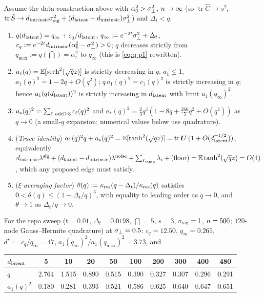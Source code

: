 \begin{lemma}\label{lem:coeffs-buf}
Assume the data construction above with $\alpha_0^2>\sigma_{\perp}^2$, $n\to\infty$ (so $\operatorname{tr}\hat C\to s^2$, $\operatorname{tr}\hat S\to d_{\mathrm{intrinsic}}\sigma_{\mathrm{sig}}^2+(d_{\mathrm{latent}}-d_{\mathrm{intrinsic}})\sigma_{\perp}^2$) and $\Delta_t<q$.
\begin{enumerate}
\item[(i)] $q(d_{\mathrm{latent}})=q_\infty+c_q/d_{\mathrm{latent}}$, $q_\infty:=e^{-2t}\sigma_{\perp}^2+\Delta_t$, $c_q:=e^{-2t}d_{\mathrm{intrinsic}}(\alpha_0^2-\sigma_{\perp}^2)>0$; $q$ decreases strictly from $q_{\max}:=q(\dint)=\alpha_t^2$ to $q_\infty$ (this is \eqref{eq:q-p1} rewritten).
\item[(ii)] $a_1(q)=\mathbb{E}[\operatorname{sech}^2(\sqrt qz)]$ is strictly decreasing in $q$, $a_1\le1$, $a_1(q)^2=1-2q+O(q^2)$; $q\,a_1(q)^2=c_1(q)^2$ is strictly increasing in $q$; hence $a_1(q(d_{\mathrm{latent}}))^2$ is strictly increasing in $d_{\mathrm{latent}}$ with limit $a_1(q_\infty)^2$.
\item[(iii)] $a_*(q)^2=\sum_{\ell\ {\rm odd}\ge3}c_\ell(q)^2$ and $a_*(q)^2=\tfrac23q^3(1-8q+\tfrac{266}{5}q^2+O(q^3))$ as $q\to0$ (a small-$q$ expansion; numerical values below use quadrature).
\item[(iv)] (\emph{Trace identity}) $a_1(q)^2q+a_*(q)^2=\mathbb{E}[\tanh^2(\sqrt qz)]=\operatorname{tr}\bm{U}\,(1+O(d_{\mathrm{latent}}^{-1/2}))$; equivalently $d_{\mathrm{intrinsic}}\lambda^{\rm sig}+(d_{\mathrm{latent}}-d_{\mathrm{intrinsic}})\lambda^{\rm noise}+\sum_{I_{\rm samp}}\lambda_i+(\text{floor})=\mathbb{E}\tanh^2(\sqrt qz)=O(1)$, which any proposed edge must satisfy.
\item[(v)] (\emph{$\xi$-averaging factor}) $\theta(q):=\kappa_{\rm res}(q-\Delta_t)/\kappa_{\rm res}(q)$ satisfies $0<\theta(q)\le(1-\Delta_t/q)^3$, with equality to leading order as $q\to0$, and $\theta\to1$ as $\Delta_t/q\to0$.
\end{enumerate}
For the repo sweep ($t=0.01$, $\Delta_t=0.0198$, $\dint=5$, $s=3$, $\sigma_{\mathrm{sig}}=1$, $n=500$; $120$-node Gauss--Hermite quadrature) at $\sigma_{\perp}=0.5$: $c_q=12.50$, $q_\infty=0.265$, $d^\star:=c_q/q_\infty=47$, $a_1(q_\infty)^2/a_1(q_{\max})^2=3.73$, and
\begin{center}\small
\begin{tabular}{lccccccccc}
$d_{\mathrm{latent}}$ & 5 & 10 & 20 & 50 & 100 & 200 & 300 & 400 & 480\\ \hline
$q$ & 2.764 & 1.515 & 0.890 & 0.515 & 0.390 & 0.327 & 0.307 & 0.296 & 0.291\\
$a_1(q)^2$ & 0.180 & 0.281 & 0.393 & 0.521 & 0.586 & 0.625 & 0.640 & 0.647 & 0.651\\

\end{tabular}
\end{center}
\end{lemma}
